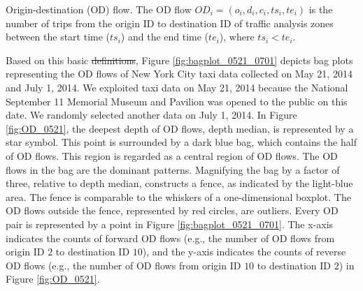 \documentclass[a4paper,UKenglish]{lipics-v2018}
\providecommand{\DIFadd}[1]{{\protect\color{blue}\uwave{#1}}} %
\providecommand{\DIFdel}[1]{{\protect\color{red}\sout{#1}}}                      %
\providecommand{\DIFaddbegin}{} %
\providecommand{\DIFaddend}{} %
\providecommand{\DIFdelbegin}{} %
\providecommand{\DIFdelend}{} %
\begin{document}
\DIFdelend \begin{definition}{Origin-destination (OD) flow.}
	The OD flow $OD_i = (o_i,d_i,c_i,ts_i, te_i)$ is the number of trips from the origin ID to destination ID of traffic analysis zones between the start time ($ts_i$) and the end time ($te_i$), where $ts_i<te_i$.
\end{definition}

Based on this basic \DIFdelbegin \DIFdel{definitions}\DIFdelend \DIFaddbegin \DIFadd{definition}\DIFaddend , Figure \ref{fig:bagplot_0521_0701} depicts bag plots representing the OD flows of New York City taxi data collected on May 21, 2014 and July 1, 2014.
We exploited taxi data on May 21, 2014 because the National September 11 Memorial Museum and Pavilion was opened to the public on this date.
We \DIFaddbegin \DIFadd{also }\DIFaddend randomly selected another data on July 1, 2014.
In Figure \ref{fig:OD_0521}, the deepest depth of OD flows, depth median, is represented by a star symbol.
This point is surrounded by a dark blue bag, which contains the half of OD flows.
This region is regarded as a central region of \DIFaddbegin \DIFadd{the }\DIFaddend OD flows.
The OD flows in the bag are the dominant patterns.
Magnifying the bag by a factor of three, relative to depth median, constructs a fence, as indicated by the light-blue area.
The fence is comparable to the whiskers of a one-dimensional boxplot.
The OD flows outside the fence, represented by red circles, are outliers.
Every OD pair is represented by a point in Figure \ref{fig:bagplot_0521_0701}.
The x-axis indicates the counts of forward OD flows (e.g., the number of OD flows from origin ID $2$ to destination ID $10$), and the y-axis indicates the counts of reverse OD flows (e.g., the number of OD flows from origin ID $10$ to destination  ID $2$) in Figure \ref{fig:OD_0521}.
\end{document}
